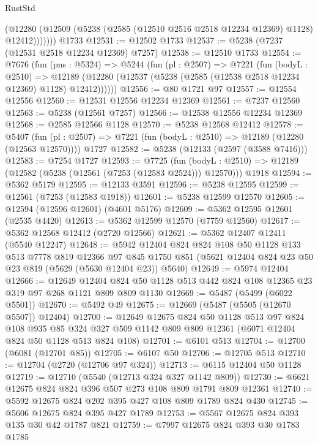 \begin{lexlean}{RustStd}
\begin{coremodule}
            (@12280 (@12509 (@5238 (@2585 (@12510 @2516 @2518 @12234 @12369) @1128) @12412)))))))
    @1733
@12531 := @12502 @1733
@12537 := @5238 (@7237 (@12531 @2518 @12234 @12369) @7257)
@12538 := @12510 @1733
@12554 := @7676
    (fun (pns : @5324) =>
    @5244
      (fun (pl : @2507) =>
      @7221
        (fun (bodyL : @2510) =>
        @12189 (@12280 (@12537 (@5238 (@2585 (@12538 @2518 @12234 @12369) @1128) @12412))))))
@12556 := @80 @1721 @97
@12557 := @12554 @12556
@12560 := @12531 @12556 @12234 @12369
@12561 := @7237 @12560
@12563 := @5238 (@12561 @7257)
@12566 := @12538 @12556 @12234 @12369
@12568 := @2585 @12566 @1128
@12570 := @5238 @12568 @12412
@12578 := @5407
    (fun (pl : @2507) => @7221 (fun (bodyL : @2510) => @12189 (@12280 (@12563 @12570))))
    @1727
@12582 := @5238 (@12133 (@2597 (@3588 @7416)))
@12583 := @7254 @1727
@12593 := @7725
    (fun (bodyL : @2510) => @12189 (@12582 (@5238 (@12561 (@7253 (@12583 @2524))) @12570)))
    @1918
@12594 := @5362 @5179
@12595 := @12133 @3591
@12596 := @5238 @12595
@12599 := @12561 (@7253 (@12583 @1918))
@12601 := @5238 @12599 @12570
@12605 := @12594 (@12596 @12601) (@4601 @5176)
@12609 := @5362 @12595 @12601 (@2535 @4420)
@12613 := @5362 @12599 @12570 (@7759 @12560)
@12617 := @5362 @12568 @12412 (@2720 @12566)
@12621 := @5362 @12407 @12411 (@5540 @12247)
@12648 := @5942
    @12404
    @824
    @824
    @108
    @50
    @1128
    @133
    @513
    @7778
    @819
    @12366
    @97
    @845
    @1750
    @851
    (@5621 @12404 @824 @23 @50 @23 @819 (@5629 (@5630 @12404 @23)) @5640)
@12649 := @5974 @12404
@12666 := @12649
    @12404
    @824
    @50
    @1128
    @513
    @442
    @824
    @108
    @12365
    @23
    @319
    @97
    @268
    @1121
    @809
    @809
    @1130
@12669 := @5487 (@5499 (@6022 @5501))
@12670 := @5492 @49
@12675 := @12669 (@5487 (@5505 (@12670 @5507)) @12404)
@12700 := @12649
    @12675
    @824
    @50
    @1128
    @513
    @97
    @824
    @108
    @935
    @85
    @324
    @327
    @509
    @1142
    @809
    @809
    @12361
    (@6071 @12404 @824 @50 @1128 @513 @824 @108)
@12701 := @6101 @513
@12704 := @12700 (@6081 (@12701 @85))
@12705 := @6107 @50
@12706 := @12705 @513
@12710 := @12704 (@2720 (@12706 @97 @324))
@12713 := @6115 @12404 @50 @1128
@12719 := @12710 (@5540 (@12713 @324 @327 @1142 @809))
@12730 := @6621 @12675 @824 @824 @396 @507 @273 @108 @809 @1791 @809 @12361
@12740 := @5592 @12675 @824 @202 @395 @427 @108 @809 @1789 @824 @430
@12745 := @5606 @12675 @824 @395 @427 @1789
@12753 := @5567 @12675 @824 @393 @135 @30 @42 @1787 @821
@12759 := @7997 @12675 @824 @393 @30 @1783 @1785

\end{coremodule}
\end{lexlean}
